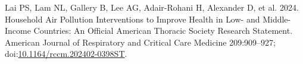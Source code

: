 \documentclass[
  letterpaper,
  DIV=11,
  numbers=noendperiod]{scrartcl}
\newlength{\cslhangindent}
\newenvironment{CSLReferences}[2] %
 {\begin{list}{}{%
  \setlength{\itemindent}{0pt}
  \setlength{\leftmargin}{0pt}
  \setlength{\parsep}{0pt}
  \ifodd #1
   \setlength{\leftmargin}{\cslhangindent}
   \setlength{\itemindent}{-1\cslhangindent}
  \fi
  \setlength{\itemsep}{#2\baselineskip}}}
 {\end{list}}
\providecommand{\DIFaddtex}[1]{{\protect\color{blue}\uwave{#1}}} %
\providecommand{\DIFaddbegin}{} %
\providecommand{\DIFaddend}{} %
\providecommand{\DIFdelend}{} %
\providecommand{\DIFadd}[1]{\texorpdfstring{\DIFaddtex{#1}}{#1}} %
\newcommand{\DIFaddincludegraphics}[2][]{{\color{blue}\fbox{\DIFOincludegraphics[#1]{#2}}}} %
\DeclareRobustCommand{\DIFaddbegin}{\DIFOaddbegin \let\includegraphics\DIFaddincludegraphics} %
\DeclareRobustCommand{\DIFaddend}{\DIFOaddend \let\includegraphics\DIFOincludegraphics} %
\DeclareRobustCommand{\DIFdelend}{\DIFOaddend \let\includegraphics\DIFOincludegraphics} %
\begin{document}

\DIFdelend \DIFaddbegin \DIFadd{:
}\DIFaddend 

\label{refs}
\begin{CSLReferences}{1}{1}
Lai PS, Lam NL, Gallery B, Lee AG, Adair-Rohani H, Alexander D, et al.
2024. Household {Air Pollution Interventions} to {Improve Health} in
{Low-} and {Middle-Income Countries}: {An Official American Thoracic
Society Research Statement}. American Journal of Respiratory and
Critical Care Medicine 209:909--927;
doi:\href{https://doi.org/10.1164/rccm.202402-0398ST}{10.1164/rccm.202402-0398ST}.

\end{CSLReferences}
\end{document}

